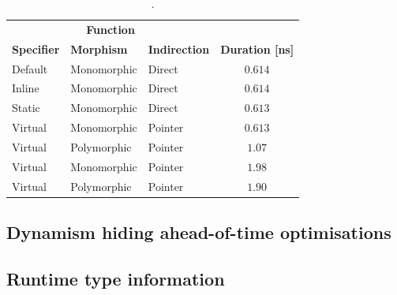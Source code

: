 \begin{table}[H]
  \caption{.}
  \label{tab:dynamic-dispatch-perf}
  \centering
  \begin{tabular}{lllc}
    \toprule
    \multicolumn{3}{c}{\textbf{Function}} \\
    \cmidrule(r){1-3}
    \textbf{Specifier} & \textbf{Morphism} & \textbf{Indirection} & \textbf{Duration [ns]} \\
    \midrule
    Default & Monomorphic & Direct & $0.614$ \\
    Inline & Monomorphic & Direct & $0.614$ \\
    Static & Monomorphic & Direct & $0.613$ \\
    Virtual & Monomorphic & Pointer & $0.613$ \\
    Virtual & Polymorphic & Pointer & $1.07$ \\
    Virtual & Monomorphic & Pointer & $1.98$ \\
    Virtual & Polymorphic & Pointer & $1.90$ \\
    \bottomrule
  \end{tabular}
\end{table}



\subsection{Dynamism hiding ahead-of-time optimisations}



\subsection{Runtime type information}



